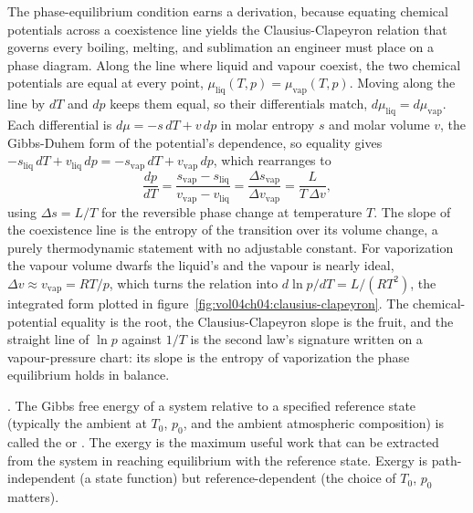 The phase-equilibrium condition earns a derivation, because equating chemical
potentials across a coexistence line yields the Clausius-Clapeyron relation that
governs every boiling, melting, and sublimation an engineer must place on a phase
diagram. Along the line where liquid and vapour coexist, the two chemical
potentials are equal at every point, $\mu_{\text{liq}}(T,p) =
\mu_{\text{vap}}(T,p)$. Moving along the line by $dT$ and $dp$ keeps them equal,
so their differentials match, $d\mu_{\text{liq}} = d\mu_{\text{vap}}$. Each
differential is $d\mu = -s\,dT + v\,dp$ in molar entropy $s$ and molar volume
$v$, the Gibbs-Duhem form of the potential's dependence, so equality gives
$-s_{\text{liq}}\,dT + v_{\text{liq}}\,dp = -s_{\text{vap}}\,dT +
v_{\text{vap}}\,dp$, which rearranges to
\[
\frac{dp}{dT} = \frac{s_{\text{vap}} - s_{\text{liq}}}{v_{\text{vap}} -
v_{\text{liq}}} = \frac{\Delta s_{\text{vap}}}{\Delta v_{\text{vap}}}
= \frac{L}{T\,\Delta v},
\]
using $\Delta s = L/T$ for the reversible phase change at temperature $T$. The
slope of the coexistence line is the entropy of the transition over its volume
change, a purely thermodynamic statement with no adjustable constant. For
vaporization the vapour volume dwarfs the liquid's and the vapour is nearly
ideal, $\Delta v \approx v_{\text{vap}} = RT/p$, which turns the relation into
$d\ln p/dT = L/(RT^2)$, the integrated form plotted in
figure~\ref{fig:vol04ch04:clausius-clapeyron}. The chemical-potential equality
is the root, the Clausius-Clapeyron slope is the fruit, and the straight line of
$\ln p$ against $1/T$ is the second law's signature written on a vapour-pressure
chart: its slope is the entropy of vaporization the phase equilibrium holds in
balance.

. The Gibbs free energy of a system
relative to a specified reference state (typically the ambient at
$T_0$, $p_0$, and the ambient atmospheric composition) is called the
 or . The exergy is the maximum
useful work that can be extracted from the system in reaching
equilibrium with the reference state. Exergy is path-independent (a
state function) but reference-dependent (the choice of $T_0$, $p_0$
matters).

